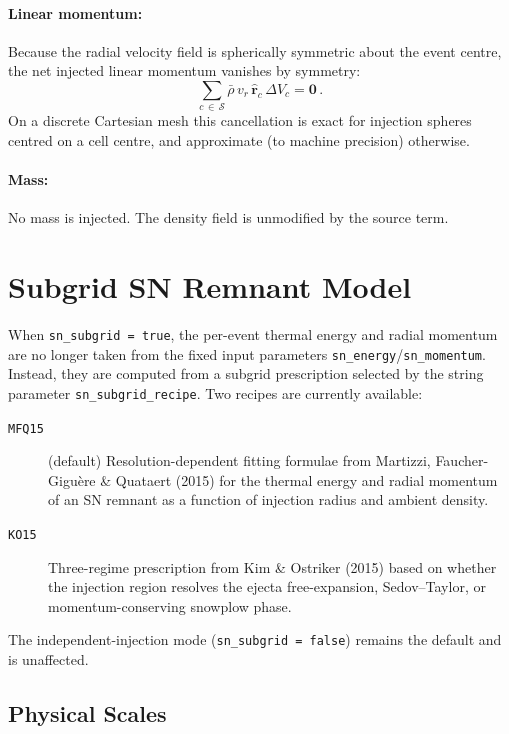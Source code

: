\documentclass[11pt]{article}
\begin{document}
\paragraph{Linear momentum:} Because the radial velocity field is spherically
symmetric about the event centre, the net injected linear momentum vanishes by
symmetry:
\begin{equation}
  \sum_{c \,\in\, \mathcal{S}} \bar{\rho}\,v_r\,\hat{\boldsymbol{r}}_c\,\Delta V_c = \mathbf{0}\,.
\end{equation}
On a discrete Cartesian mesh this cancellation is exact for injection spheres
centred on a cell centre, and approximate (to machine precision) otherwise.

\paragraph{Mass:} No mass is injected.  The density field is unmodified by the
source term.

\section{Subgrid SN Remnant Model}
\label{sec:subgrid}

When \texttt{sn\_subgrid = true}, the per-event thermal energy and radial
momentum are no longer taken from the fixed input parameters
\texttt{sn\_energy}/\texttt{sn\_momentum}.  Instead, they are computed from
a subgrid prescription selected by the string parameter
\texttt{sn\_subgrid\_recipe}.  Two recipes are currently available:

\begin{description}
  \item[\texttt{MFQ15}] (default) Resolution-dependent fitting formulae from
    Martizzi, Faucher-Gigu\`ere \& Quataert (2015) for the thermal energy and
    radial momentum of an SN remnant as a function of injection radius and
    ambient density.
  \item[\texttt{KO15}] Three-regime prescription from Kim \& Ostriker (2015)
    based on whether the injection region resolves the ejecta free-expansion,
    Sedov--Taylor, or momentum-conserving snowplow phase.
\end{description}

The independent-injection mode (\texttt{sn\_subgrid = false}) remains the
default and is unaffected.

\subsection{Physical Scales}
\end{document}
